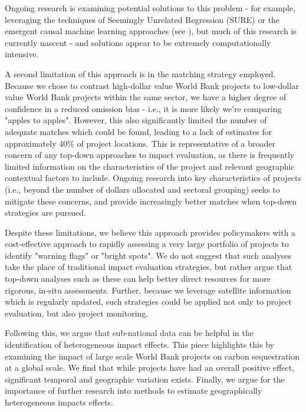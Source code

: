 \documentclass{article}\usepackage[]{graphicx}\usepackage[]{color}
\newenvironment{knitrout}{}{}  %
\begin{document}
\begin{knitrout}
Ongoing research is examining potential solutions to this problem - for example, leveraging the techniques of Seemingly Unrelated Regression (SURE) or the emergent causal machine learning approaches (see \cite{athey_recursive_2015}), but much of this research is currently nascent - and solutions appear to be extremely computationally intensive.
\par
A second limitation of this approach is in the matching strategy employed.
Because we chose to contrast high-dollar value World Bank projects to low-dollar value World Bank projects within the same sector, we have a higher degree of confidence in a reduced omission bias - i.e., it is more likely we're comparing "apples to apples".
However, this also significantly limited the number of adequate matches which could be found, leading to a lack of estimates for approximately 40\% of project locations.
This is representative of a broader concern of any top-down approaches to impact evaluation, as there is frequently limited information on the characteristics of the project and relevant geographic contextual factors to include.
Ongoing research into key characteristics of projects (i.e., beyond the number of dollars allocated and sectoral grouping) seeks to mitigate these concerns, and provide increasingly better matches when top-down strategies are pursued.
\par
Despite these limitations, we believe this approach provides policymakers with a cost-effective approach to rapidly assessing a very large portfolio of projects to identify "warning flags" or "bright spots".  
We do not suggest that such analyses take the place of traditional impact evaluation strategies, but rather argue that top-down analyses such as these can help better direct resources for more rigorous, in-situ assessments.
Further, because we leverage satellite information which is regularly updated, such strategies could be applied not only to project evaluation, but also project monitoring.
\par
Following this, we argue that sub-national data can be helpful in the identification of  heterogeneous impact effects. 
This piece highlights this by examining the impact of large scale World Bank projects on carbon sequestration at a global scale.  
We find that while projects have had an overall positive effect, significant temporal and geographic variation exists.
Finally, we argue for the importance of further research into methods to estimate geographically heterogeneous impacts effects.
\newpage


\end{knitrout}
\end{document}
